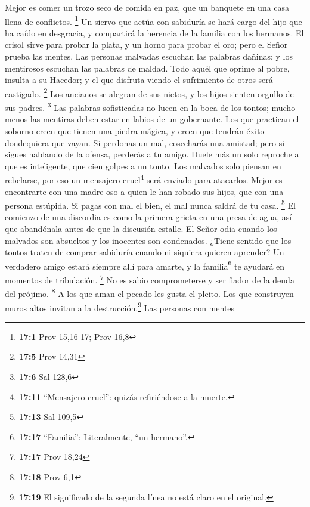  Mejor es comer un trozo seco de comida en paz, que un
banquete en una casa llena de conflictos. \footnote{\textbf{17:1} Prov
  15,16-17; Prov 16,8}  Un siervo que actúa con sabiduría
se hará cargo del hijo que ha caído en desgracia, y compartirá la
herencia de la familia con los hermanos.  El crisol sirve
para probar la plata, y un horno para probar el oro; pero el Señor
prueba las mentes.  Las personas malvadas escuchan las
palabras dañinas; y los mentirosos escuchan las palabras de maldad.
 Todo aquél que oprime al pobre, insulta a su Hacedor; y
el que disfruta viendo el sufrimiento de otros será castigado.
\footnote{\textbf{17:5} Prov 14,31}  Los ancianos se
alegran de sus nietos, y los hijos sienten orgullo de sus padres.
\footnote{\textbf{17:6} Sal 128,6}  Las palabras
sofisticadas no lucen en la boca de los tontos; mucho menos las mentiras
deben estar en labios de un gobernante.  Los que practican
el soborno creen que tienen una piedra mágica, y creen que tendrán éxito
dondequiera que vayan.  Si perdonas un mal, cosecharás una
amistad; pero si sigues hablando de la ofensa, perderás a tu amigo.
 Duele más un solo reproche al que es inteligente, que
cien golpes a un tonto.  Los malvados solo piensan en
rebelarse, por eso un mensajero cruel\footnote{\textbf{17:11}
  ``Mensajero cruel'': quizás refiriéndose a la muerte.} será enviado
para atacarlos.  Mejor es encontrarte con una madre oso a
quien le han robado sus hijos, que con una persona estúpida.
 Si pagas con mal el bien, el mal nunca saldrá de tu
casa. \footnote{\textbf{17:13} Sal 109,5}  El comienzo de
una discordia es como la primera grieta en una presa de agua, así que
abandónala antes de que la discusión estalle.  El Señor
odia cuando los malvados son absueltos y los inocentes son condenados.
 ¿Tiene sentido que los tontos traten de comprar
sabiduría cuando ni siquiera quieren aprender?  Un
verdadero amigo estará siempre allí para amarte, y la familia\footnote{\textbf{17:17}
  ``Familia'': Literalmente, ``un hermano''.} te ayudará en momentos de
tribulación. \footnote{\textbf{17:17} Prov 18,24}  No es
sabio comprometerse y ser fiador de la deuda del prójimo. \footnote{\textbf{17:18}
  Prov 6,1}  A los que aman el pecado les gusta el
pleito. Los que construyen muros altos invitan a la
destrucción.\footnote{\textbf{17:19} El significado de la segunda línea
  no está claro en el original.}  Las personas con mentes
